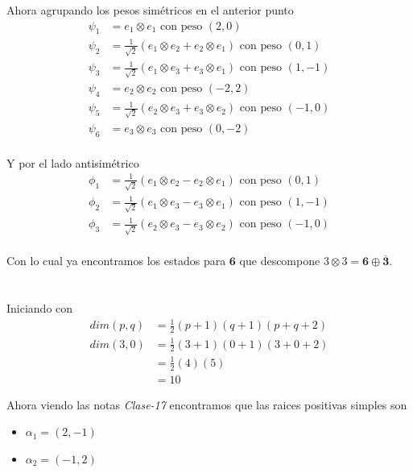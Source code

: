 \documentclass[12pt]{amsart}
\begin{document}
Ahora agrupando los pesos simétricos en el anterior punto
\begin{align*}
  \psi_1 &= e_1 \otimes e_1 \text{ con peso } (2, 0)\\
  \psi_2 &= \frac{1}{\sqrt{2}} (e_1 \otimes e_2 + e_2 \otimes e_1) \text{ con peso } (0, 1)\\
  \psi_3 &= \frac{1}{\sqrt{2}} (e_1 \otimes e_3 + e_3 \otimes e_1) \text{ con peso } (1, -1)\\
  \psi_4 &= e_2 \otimes e_2 \text{ con peso } (-2, 2)\\
  \psi_5 &= \frac{1}{\sqrt{2}} (e_2 \otimes e_3 + e_3 \otimes e_2) \text{ con peso } (-1, 0)\\
  \psi_6 &= e_3 \otimes e_3 \text{ con peso } (0, -2)\\
\end{align*}

Y por el lado antisimétrico
\begin{align*}
  \phi_1 &= \frac{1}{\sqrt{2}} (e_1 \otimes e_2 - e_2 \otimes e_1) \text{ con peso } (0, 1)\\
  \phi_2 &= \frac{1}{\sqrt{2}} (e_1 \otimes e_3 - e_3 \otimes e_1) \text{ con peso } (1, -1)\\
  \phi_3 &= \frac{1}{\sqrt{2}} (e_2 \otimes e_3 - e_3 \otimes e_2) \text{ con peso } (-1, 0)\\
\end{align*}

Con lo cual ya encontramos los estados para $\mathbf{6}$ que descompone $3 \otimes 3 = \mathbf{6} \oplus \overline{\mathbf{3}}$.

\pagebreak

\section{}

Iniciando con
\begin{align*}
  dim(p, q) &= \frac{1}{2}(p + 1)(q + 1)(p + q + 2)\\
  dim(3, 0) &= \frac{1}{2}(3 + 1)(0 + 1)(3 + 0 + 2)\\
  &= \frac{1}{2}(4)(5)\\
  &= 10
\end{align*}

Ahora viendo las notas \textit{Clase-17} encontramos que las raices positivas simples son
\begin{itemize}
  \item $\alpha_1 = (2, -1)$
  \item $\alpha_2 = (-1, 2)$
\end{itemize}
\end{document}
